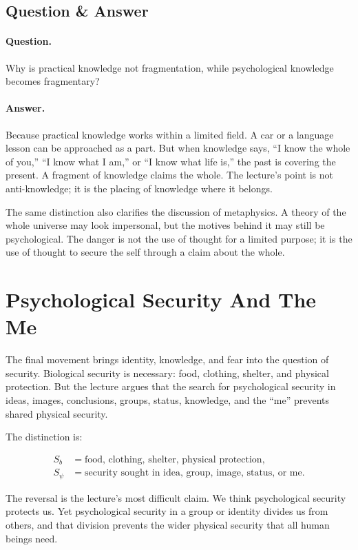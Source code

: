 \subsection{Question \& Answer}

\paragraph{Question.}
Why is practical knowledge not fragmentation, while psychological knowledge becomes fragmentary?

\paragraph{Answer.}
Because practical knowledge works within a limited field. A car or a language lesson can be approached as a part. But when knowledge says, ``I know the whole of you,'' ``I know what I am,'' or ``I know what life is,'' the past is covering the present. A fragment of knowledge claims the whole. The lecture's point is not anti-knowledge; it is the placing of knowledge where it belongs.

The same distinction also clarifies the discussion of metaphysics. A theory of the whole universe may look impersonal, but the motives behind it may still be psychological. The danger is not the use of thought for a limited purpose; it is the use of thought to secure the self through a claim about the whole.

\section{Psychological Security And The Me}

The final movement brings identity, knowledge, and fear into the question of security. Biological security is necessary: food, clothing, shelter, and physical protection. But the lecture argues that the search for psychological security in ideas, images, conclusions, groups, status, knowledge, and the ``me'' prevents shared physical security.

The distinction is:

\begin{align}
S_b &= \text{food, clothing, shelter, physical protection},\\
S_{\psi} &= \text{security sought in idea, group, image, status, or me}.
\end{align}

The reversal is the lecture's most difficult claim. We think psychological security protects us. Yet psychological security in a group or identity divides us from others, and that division prevents the wider physical security that all human beings need.

